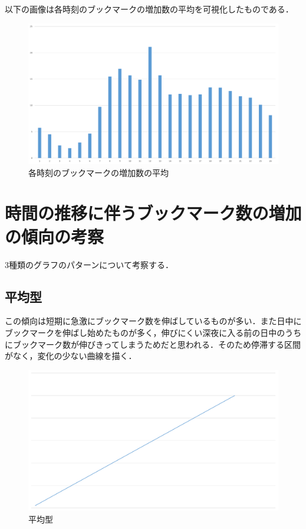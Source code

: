 以下の画像は各時刻のブックマークの増加数の平均を可視化したものである．

\begin{figure}[htb]
\centering
\includegraphics[width=13cm]{b-k.pdf}
\caption{各時刻のブックマークの増加数の平均}\label{bk}
\end{figure}

\newpage

\section{時間の推移に伴うブックマーク数の増加の傾向の考察}
3種類のグラフのパターンについて考察する．
\subsection{平均型}
この傾向は短期に急激にブックマーク数を伸ばしているものが多い．また日中にブックマークを伸ばし始めたものが多く，伸びにくい深夜に入る前の日中のうちにブックマーク数が伸びきってしまうためだと思われる．そのため停滞する区間がなく，変化の少ない曲線を描く．


\begin{figure}[htb]
\centering
\includegraphics[width=13cm]{g1.pdf}
\caption{平均型}\label{g1}
\end{figure}


